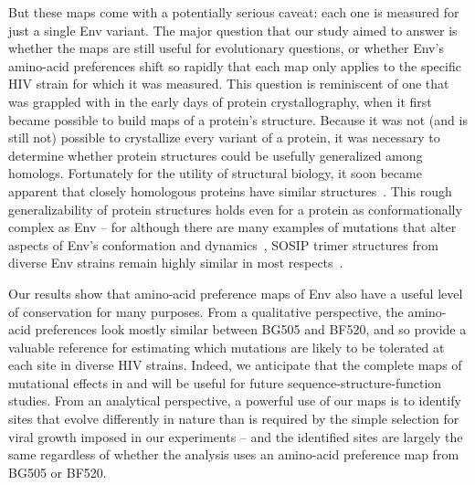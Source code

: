\documentclass[9pt]{elife}
\begin{document}
But these maps come with a potentially serious caveat: each one is measured for just a single Env variant.
The major question that our study aimed to answer is whether the maps are still useful for evolutionary questions, or whether Env's amino-acid preferences shift so rapidly that each map only applies to the specific HIV strain for which it was measured.
This question is reminiscent of one that was grappled with in the early days of protein crystallography, when it first became possible to build maps of a protein's structure.
Because it was not (and is still not) possible to crystallize every variant of a protein, it was necessary to determine whether protein structures could be usefully generalized among homologs.
Fortunately for the utility of structural biology, it soon became apparent that closely homologous proteins have similar structures~\citep{chothia1986relation,sander1991database}.
This rough generalizability of protein structures holds even for a protein as conformationally complex as Env -- for although there are many examples of mutations that alter aspects of Env's conformation and dynamics~\citep{kwong2000structures,white2010molecular,almond2010structural,davenport2013isolate}, SOSIP trimer structures from diverse Env strains remain highly similar in most respects~\citep{julien2015design,pugach2015native,stewart2016trimeric,verkerke2016epitope,gristick2016natively}.

Our results show that amino-acid preference maps of Env also have a useful level of conservation for many purposes.
From a qualitative perspective, the amino-acid preferences look mostly similar between BG505 and BF520, and so provide a valuable reference for estimating which mutations are likely to be tolerated at each site in diverse HIV strains.
Indeed, we anticipate that the complete maps of mutational effects in  and  will be useful for future sequence-structure-function studies.
From an analytical perspective, a powerful use of our maps is to identify sites that evolve differently in nature than is required by the simple selection for viral growth imposed in our experiments -- and the identified sites are largely the same regardless of whether the analysis uses an amino-acid preference map from BG505 or BF520.
\end{document}
